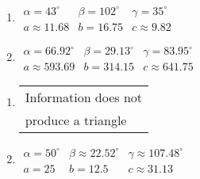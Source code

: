 \documentclass{ximera}
\begin{document}
\begin{multicols}{2} 

\begin{enumerate}

\setcounter{enumi}{\value{HW}}

\item $\begin{array}{lll}
\alpha = 43^{\circ} & \beta = 102^{\circ} & \gamma = 35^{\circ} \\
a \approx 11.68 & b = 16.75 & c \approx 9.82 \end{array}$

\item $\begin{array}{lll}
\alpha = 66.92^{\circ} & \beta = 29.13^{\circ} & \gamma = 83.95^{\circ} \\
a \approx 593.69 & b = 314.15 & c \approx 641.75 \end{array}$

\setcounter{HW}{\value{enumi}}

\end{enumerate}

\end{multicols}

\begin{multicols}{2} 

\begin{enumerate}

\setcounter{enumi}{\value{HW}}

\item \begin{tabular}{l}
Information does not \\
produce a triangle \end{tabular}

\item $\begin{array}{lll}
\alpha = 50^{\circ} & \beta \approx 22.52^{\circ} & \gamma \approx 107.48^{\circ} \\
a = 25 & b = 12.5 & c \approx 31.13 \end{array}$

\setcounter{HW}{\value{enumi}}

\end{enumerate}

\end{multicols}
\end{document}
